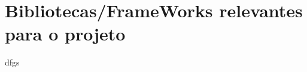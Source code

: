\begin{comment}
"Python é uma linguagem de programação de alto nível e propósito geral. A sua filosofia
de design enfatiza a legibilidade do código com o uso de indentação significativa.

Python é dinamicamente tipada e possui coleta de lixo automática. 
Suporta múltiplos paradigmas de programação, incluindo estruturada (particularmente 
procedural), orientada a objetos e programação funcional. É frequentemente descrita como 
uma linguagem "com tudo incluído", devido à sua biblioteca padrão abrangente." \cite{python}



As principais cracteriasaticas desta linguagem são:

\begin{itemize}
\item \textbf{Sintaxe Clara e Concisa}: Python é conhecido pela sua sintaxe limpa
e fácil de ler, o que a torna ideal para iniciantes e facilita a manutenção de código;
\item \textbf{Tipagem Dinâmica}: Em Python, não é necessário declarar explicitamente o
tipo de uma variável. O tipo é inferido dinamicamente durante a execução do programa;
\item \textbf{Multiparadigma}: Python suporta diversos paradigmas de programação,
incluindo programação orientada a objetos, programação imperativa e programação funcional;
\item \textbf{Biblioteca Padrão Abrangente}: Python vem com uma vasta biblioteca 
padrão que oferece suporte para uma ampla gama de tarefas, desde manipulação de arquivos 
até desenvolvimento web;
\item \textbf{Comunidade Ativa}:Python possui uma comunidade enorme e ativa de 
desenvolvedores em todo o mundo. Isto resulta numa grande quantidade
de recursos disponíveis, como bibliotecas de terceiros, frameworks e ferramentas 
de desenvolvimento.
\end{itemize}


"Python é suficientemente rápido para o nosso site e permite-nos produzir funcionalidades 
mantíveis em tempos recorde, com um mínimo de programadores." \cite{pyyt}

\end{comment}

\section{Bibliotecas/FrameWorks relevantes para o projeto}

dfgs

